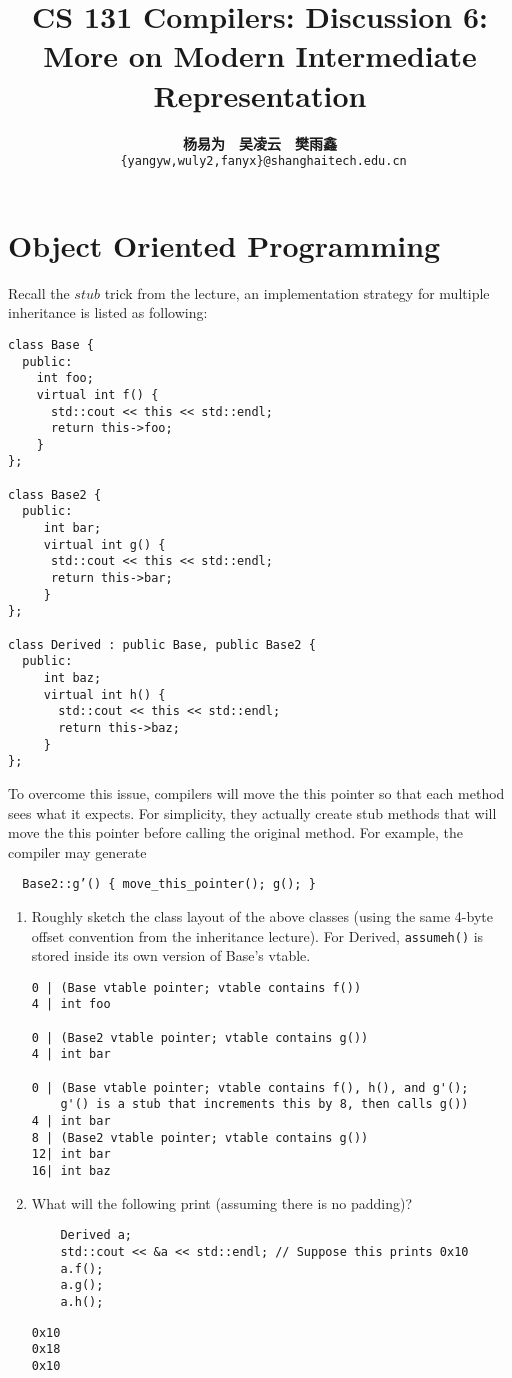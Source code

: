 \documentclass[a4paper]{exam}
\title{CS 131 Compilers: Discussion 6: More on Modern Intermediate Representation}
\author{\textbf{杨易为}~~\textbf{吴凌云}~~\textbf{樊雨鑫} \\ \texttt{ \{yangyw,wuly2,fanyx\}@shanghaitech.edu.cn}}
\theoremstyle{definition}
\begin{document}
\maketitle
\section{Object Oriented Programming}
Recall the $stub$ trick from the lecture, an implementation strategy for multiple inheritance is listed as following:

\begin{verbatim}
class Base {
  public:
    int foo;
    virtual int f() {
      std::cout << this << std::endl; 
      return this->foo;
    }
};

class Base2 {
  public:
     int bar;
     virtual int g() {
      std::cout << this << std::endl; 
      return this->bar;
     }
};

class Derived : public Base, public Base2 {
  public:
     int baz;
     virtual int h() {
       std::cout << this << std::endl; 
       return this->baz;
     }
};
\end{verbatim}

To overcome this issue, compilers will move the this pointer so that each method sees what it expects. For simplicity, they actually create stub methods that will move the this pointer before calling the original method. For example, the compiler may generate

\begin{verbatim}
  Base2::g’() { move_this_pointer(); g(); }
\end{verbatim}

\begin{enumerate}
  \item Roughly sketch the class layout of the above classes (using the same 4-byte offset convention from the inheritance lecture). For Derived, \texttt{assumeh()} is stored inside its own version of Base’s vtable.
  \begin{solution}
\begin{verbatim}
0 | (Base vtable pointer; vtable contains f())
4 | int foo

0 | (Base2 vtable pointer; vtable contains g())
4 | int bar

0 | (Base vtable pointer; vtable contains f(), h(), and g'(); 
    g'() is a stub that increments this by 8, then calls g())
4 | int bar
8 | (Base2 vtable pointer; vtable contains g())
12| int bar
16| int baz
\end{verbatim}
  \end{solution}
 \item What will the following print (assuming there is no padding)?
\begin{verbatim}
    Derived a;
    std::cout << &a << std::endl; // Suppose this prints 0x10
    a.f();
    a.g();
    a.h();
\end{verbatim}
\begin{solution}
\begin{verbatim}
0x10
0x18
0x10
\end{verbatim}
\end{solution}
\end{enumerate}
\end{document}
